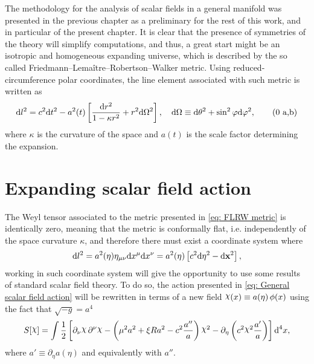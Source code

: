 The methodology for the analysis of scalar fields in a general manifold was presented in the previous chapter as a  preliminary for the rest of this work, and in particular of the present chapter. It is clear that the presence of symmetries of the theory will simplify computations, and thus, a great start might be an isotropic and homogeneous expanding universe, which is described by the so called Friedmann–Lemaître–Robertson–Walker metric. Using  reduced-circumference polar coordinates, the line element associated with such metric is written as
\begin{subequations}\label{eq: FLRW metric}
	\begin{gather}
		\text{d} l^2 =c^2\text{d} t^2 -a^2(t)\left[\frac{\text{d} r^2}{1-\kappa r^2}+r^2\text{d}\Omega^2\right],\quad \text{d}\Omega\equiv \text{d}\theta^2+\sin^2\varphi\text{d}\varphi^2,\tag{\theequation \,\,a,b}
	\end{gather}
\end{subequations}
where $\kappa$ is the curvature of the space and $a(t)$ is the scale factor determining the expansion.
\section{Expanding scalar field action}
The Weyl tensor associated to the metric presented in \cref{eq: FLRW metric} is identically zero, meaning that the metric is conformally flat, i.e. independently of the space curvature $\kappa$, and therefore there must exist a coordinate system where
\begin{equation}\label{eq: Conformal FLRW}
	\text{d} l^2=a^2(\eta)\eta_{\mu\nu}\text{d} x^\mu\text{d} x^\nu=a^2(\eta)\left[c^2\text{d} \eta^2-\text{d}\mathbf{x}^2\right],
\end{equation}
working in such coordinate system will give the opportunity to use some results of standard scalar field theory. To do so, the action presented in \cref{eq: General scalar field action} will be rewritten in terms of a new field $\rchi(x)\equiv a(\eta)\,\phi(x)$ using the fact that $\sqrt{-g}=a^4$ 
\begin{equation}
	S[\rchi]=\int\frac{1}{2}\left[\partial_\nu\rchi\,\partial^\nu\rchi-\left(\mu^2a^2+\xi R a^2-c^2\frac{a''}{a}\right)\rchi^2-\partial_\eta\left(c^2\rchi^2\frac{a'}{a}\right)\right]\td^4 x,
\end{equation}
where $a'\equiv \partial_\eta a(\eta)$ and equivalently with $a''$.

